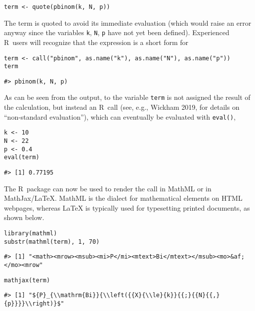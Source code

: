 \begin{verbatim}
term <- quote(pbinom(k, N, p))
\end{verbatim}

The term is quoted to avoid its immediate evaluation (which would raise an error
anyway since the variables \texttt{k}, \texttt{N}, \texttt{p} have not yet been defined). Experienced
R~users will recognize that the expression is a short form for

\begin{verbatim}
term <- call("pbinom", as.name("k"), as.name("N"), as.name("p"))
term
\end{verbatim}

\begin{verbatim}
#> pbinom(k, N, p)
\end{verbatim}

As can be seen from the output, to the variable \texttt{term} is not assigned the
result of the calculation, but instead an R~call (see, e.g., Wickham 2019,
for details on ``non-standard evaluation''), which can eventually be evaluated
with \texttt{eval()},

\begin{verbatim}
k <- 10
N <- 22
p <- 0.4
eval(term)
\end{verbatim}

\begin{verbatim}
#> [1] 0.77195
\end{verbatim}

The R~package  can now be used to render the call in MathML or in
MathJax/LaTeX. MathML is the dialect for mathematical elements on HTML webpages,
whereas LaTeX is typically used for typesetting printed documents, as shown
below.

\begin{verbatim}
library(mathml)
substr(mathml(term), 1, 70)
\end{verbatim}

\begin{verbatim}
#> [1] "<math><mrow><msub><mi>P</mi><mtext>Bi</mtext></msub><mo>&af;</mo><mrow"
\end{verbatim}

\begin{verbatim}
mathjax(term)
\end{verbatim}

\begin{verbatim}
#> [1] "${P}_{\\mathrm{Bi}}{\\left({{X}{\\le}{k}}{{;}{{N}{{,}{p}}}}\\right)}$"
\end{verbatim}

